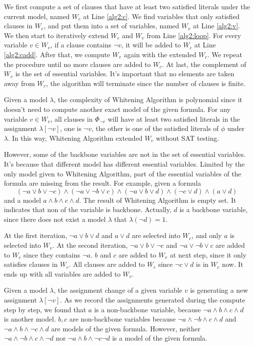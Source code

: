 We first compute a set of clauses that have at least two satisfied literals under the current model, named $W_c$ at Line \ref{alg2:c}. We find variables that only satisfied clauses in $W_c$, and put them into a set of variables, named $W_v$ at Line \ref{alg2:v}. We then start to iteratively extend $W_c$ and $W_v$ from Line \ref{alg2:loop}. For every variable $v\in W_v$, if a clause contains $\neg v$, it will be added to $W_c$ at Line \ref{alg2:cadd}. After that, we compute $W_v$ again with the extended $W_c$. We repeat the procedure until no more clauses are added to $W_c$. At last, the complement of $W_v$ is the set of essential variables. It's important that no elements are taken away from $W_c$, the algorithm will terminate since the number of clauses is finite.

Given a model $\lambda$, the complexity of Whitening Algorithm is polynomial since it doesn't need to compute another exact model of the given formula. For any variable $v\in W_v$, all clauses in $\Phi_{\neg v}$ will have at least two satisfied literals in the assignment $\lambda[\neg v]$, one is $\neg v$, the other is one of the satisfied literals of $\phi$ under $\lambda$. In this way, Whitening Algorithm extended $W_c$ without SAT testing.

However, some of the backbone variables are not in the set of essential variables. It's because that different model has different essential variables. Limited by the only model given to Whitening Algorithm, part of the essential variables of the formula are missing from the result. For example, given a formula
\[(\neg a\vee b\vee\neg c)\wedge(\neg a\vee\neg b\vee c)\wedge(\neg a\vee b\vee d)\wedge(\neg c\vee d)\wedge(a\vee d)\]
and a model $a\wedge b\wedge c\wedge d$. The result of Whitening Algorithm is empty set. It indicates that non of the variable is backbone. Actually, $d$ is a backbone variable, since there does not exist a model $\lambda$ that $\lambda(\neg d)=1$.

At the first iteration, $\neg a\vee b\vee d$ and $a\vee d$ are selected into $W_c$, and only $a$ is selected into $W_v$. At the second iteration, $\neg a\vee b\vee \neg c$ and $\neg a\vee\neg b\vee c$ are added to $W_c$ since they contains $\neg a$. $b$ and $c$ are added to $W_v$ at next step, since it only satisfies clauses in $W_c$. All clauses are added to $W_c$ since $\neg c\vee d$ is in $W_c$ now. It ends up with all variables are added to $W_v$.

Given a model $\lambda$, the assignment change of a given variable $v$ is generating a new assignment $\lambda[\neg v]$. As we record the assignments generated during the compute step by step, we found that $a$ is a non-backbone variable, because $\neg a\wedge b\wedge c\wedge d$ is another model. $b,c$ are non-backbone variables because $\neg a\wedge \neg b\wedge c\wedge d$ and $\neg a\wedge b\wedge \neg c\wedge d$ are models of the given formula. However, neither $\neg a\wedge \neg b\wedge c\wedge \neg d$ nor $\neg a\wedge b\wedge \neg c\neg d$ is a model of the given formula.

